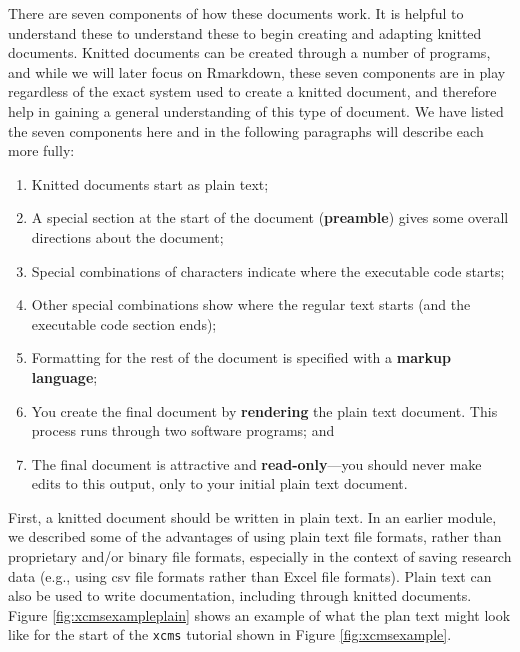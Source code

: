 \documentclass[]{tufte-book}
\providecommand{\tightlist}{%
  \setlength{\itemsep}{0pt}\setlength{\parskip}{0pt}}
\begin{document}
There are seven components of how these documents work. It is helpful to
understand these to understand these to begin creating and adapting knitted
documents. Knitted documents can be created through a number of programs, and
while we will later focus on Rmarkdown, these seven components are in play
regardless of the exact system used to create a knitted document, and therefore
help in gaining a general understanding of this type of document. We have listed
the seven components here and in the following paragraphs will describe each
more fully:

\begin{enumerate}
\def\labelenumi{\arabic{enumi}.}
\tightlist
\item
  Knitted documents start as plain text;
\item
  A special section at the start of the document (\textbf{preamble}) gives some
  overall directions about the document;
\item
  Special combinations of characters indicate where the executable code starts;
\item
  Other special combinations show where the regular text starts (and the
  executable code section ends);
\item
  Formatting for the rest of the document is specified with a \textbf{markup
  language};
\item
  You create the final document by \textbf{rendering} the plain text document. This
  process runs through two software programs; and
\item
  The final document is attractive and \textbf{read-only}---you should never make
  edits to this output, only to your initial plain text document.
\end{enumerate}

First, a knitted document should be written in plain text. In an earlier module,
we described some of the advantages of using plain text file formats, rather
than proprietary and/or binary file formats, especially in the context of saving
research data (e.g., using csv file formats rather than Excel file formats).
Plain text can also be used to write documentation, including through knitted
documents. Figure \ref{fig:xcmsexampleplain} shows an example of what the plan text might look like for the
start of the \texttt{xcms} tutorial shown in Figure \ref{fig:xcmsexample}.
\end{document}
